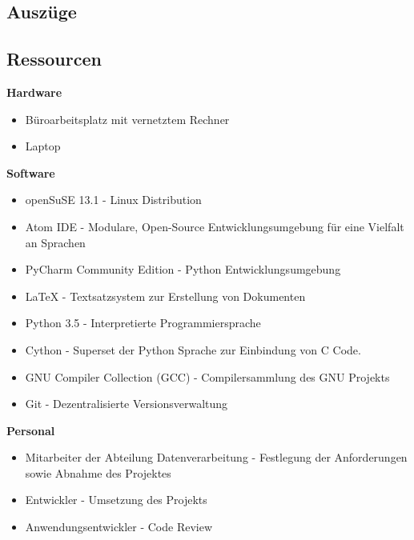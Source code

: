 \subsection{Auszüge}
\subsection{Ressourcen}
\label{auszug:ressourcen}
\textbf{Hardware}
\begin{itemize}
    \item Büroarbeitsplatz mit vernetztem Rechner
    \item Laptop
\end{itemize}

\textbf{Software}
\begin{itemize}
    \item openSuSE 13.1 - Linux Distribution
    \item Atom IDE - Modulare, Open-Source Entwicklungsumgebung für eine Vielfalt an Sprachen
    \item PyCharm Community Edition - Python Entwicklungsumgebung
    \item LaTeX - Textsatzsystem zur Erstellung von Dokumenten
    \item Python 3.5 - Interpretierte Programmiersprache
    \item Cython - Superset der Python Sprache zur Einbindung von C Code.
    \item GNU Compiler Collection (GCC) - Compilersammlung des GNU Projekts
    \item Git - Dezentralisierte Versionsverwaltung
\end{itemize}

\textbf{Personal}
\begin{itemize}
    \item Mitarbeiter der Abteilung Datenverarbeitung - Festlegung der Anforderungen sowie Abnahme des Projektes
    \item Entwickler - Umsetzung des Projekts
    \item Anwendungsentwickler - Code Review
\end{itemize}


